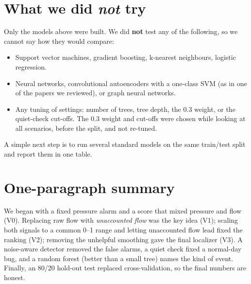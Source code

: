 \documentclass[11pt,a4paper]{article}
\begin{document}
\section{What we did \emph{not} try}
\begin{note}
Only the models above were built. We did \textbf{not} test any of the following, so we cannot say how they would compare:
\end{note}
\begin{itemize}
\item Support vector machines, gradient boosting, k-nearest neighbours, logistic regression.
\item Neural networks, convolutional autoencoders with a one-class SVM (as in one of the papers we reviewed), or graph neural networks.
\item Any tuning of settings: number of trees, tree depth, the 0.3 weight, or the quiet-check cut-offs. The 0.3 weight and cut-offs were chosen while looking at all scenarios, before the split, and not re-tuned.
\end{itemize}
A simple next step is to run several standard models on the same train/test split and report them in one table.

\section{One-paragraph summary}
We began with a fixed pressure alarm and a score that mixed pressure and flow (V0). Replacing raw flow with \emph{unaccounted flow} was the key idea (V1); scaling both signals to a common 0--1 range and letting unaccounted flow lead fixed the ranking (V2); removing the unhelpful smoothing gave the final localizer (V3). A noise-aware detector removed the false alarms, a quiet check fixed a normal-day bug, and a random forest (better than a small tree) names the kind of event. Finally, an 80/20 hold-out test replaced cross-validation, so the final numbers are honest.
\end{document}
